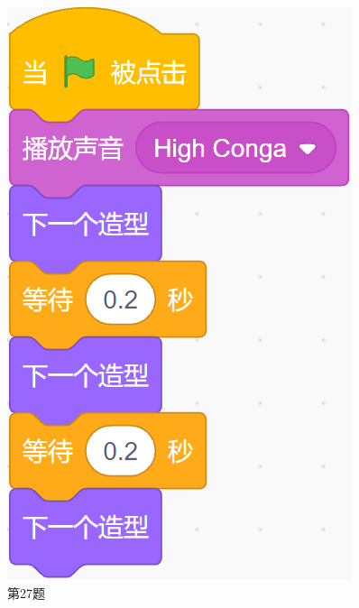 \documentclass[10pt, a4paper]{article}
\begin{document}
\begin{enumerate}
\begin{figure}[htbp]
\begin{minipage}[t]{.48\textwidth}
\begin{minipage}[t]{.4\textwidth}
                \end{minipage}
                \begin{minipage}[t]{.25\textwidth}
                    \centering
                    \includegraphics[width=\textwidth]{27-2.png}
                \end{minipage}
                \caption*{第27题}
            \end{minipage}
            \begin{minipage}[t]{.3\textwidth}
                \centering

\end{minipage}
\end{figure}
\end{enumerate}
\end{document}
